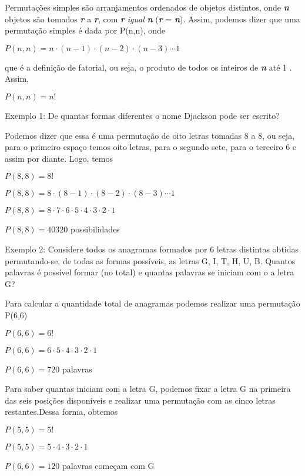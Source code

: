 Permutações simples são arranjamentos ordenados de objetos distintos, onde \textbf{\textit{n}} objetos são tomados \textbf{\textit{r}} a \textbf{\textit{r}}, com \textbf{\textit{r}} \textit{igual} \textbf{\textit{n}} (\textbf{\textit{r}} = \textbf{\textit{n}}). Assim, podemos dizer que uma permutação simples é dada por P(n,n), onde
\begin{center}
	$P(n,n)=n \cdot (n-1) \cdot (n-2) \cdot (n-3) \cdots 1$
\end{center}

\noindent 
que é a definição de fatorial, ou seja, o produto de todos os inteiros de \textbf{\textit{n}} até 1 \cite{niven1965mathematics}. Assim,
\begin{center}
	$P(n,n)=n!$
\end{center}

\noindent
Exemplo 1: De quantas formas diferentes o nome Djackson pode ser escrito?

Podemos dizer que essa é uma permutação de oito letras tomadas $8$ a $8$, ou seja, para o primeiro espaço temos oito letras, para o segundo sete, para o terceiro $6$ e assim por diante. Logo, temos

\begin{center}
	$P(8,8)=8!$
	
	$P(8,8)=8 \cdot (8-1) \cdot (8-2) \cdot (8-3) \cdots 1$
	
	$P(8,8)= 8 \cdot 7 \cdot 6 \cdot 5 \cdot 4 \cdot 3 \cdot 2 \cdot 1$
	
	$P(8,8)=40320$ possibilidades 
\end{center}

\noindent
Exemplo 2: Considere todos os anagramas formados por 6 letras distintas obtidas permutando-se, de todas as formas possíveis, as letras G, I, T, H, U, B. Quantos palavras é possível formar (no total) e quantas palavras se iniciam com o a letra G?

Para calcular a quantidade total de anagramas podemos realizar uma permutação P(6,6)

\begin{center}
	$P(6,6)=6!$
	
	$P(6,6)= 6 \cdot 5 \cdot 4 \cdot 3 \cdot 2 \cdot 1$
	
	$P(6,6)=720$ palavras
\end{center}

Para saber quantas iniciam com a letra G, podemos fixar a letra G na primeira das seis posições disponíveis e realizar uma permutação com as cinco letras restantes.Dessa forma, obtemos
\begin{center}
	$P(5,5)=5!$
	
	$P(5,5)=5 \cdot 4 \cdot 3 \cdot 2 \cdot 1$
	
	$P(6,6)=120$ palavras começam com G
\end{center}